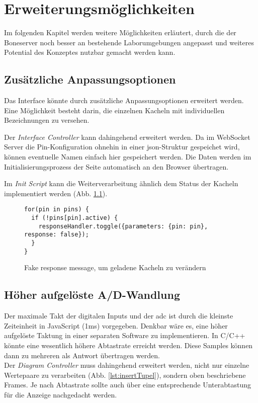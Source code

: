 \chapter{Erweiterungsmöglichkeiten}
Im folgenden Kapitel werden weitere Möglichkeiten erläutert, durch die der Boneserver noch besser an bestehende Laborumgebungen angepasst und weiteres Potential des Konzeptes nutzbar gemacht werden kann.

\section{Zusätzliche Anpassungsoptionen}
Das Interface könnte durch zusätzliche Anpassungsoptionen erweitert werden. Eine Mög\-lich\-keit besteht darin, die einzelnen Kacheln mit individuellen Bezeichnungen zu versehen.

Der \textit{Interface Controller} kann dahingehend erweitert werden. Da im WebSocket Server die Pin-Konfiguration ohnehin in einer \gls{json}-Struktur gespeichet wird, können eventuelle Namen einfach hier gespeichert werden. Die Daten werden im Initialisierungsprozess der Seite automatisch an den Browser übertragen.

Im \textit{Init Script} kann die Weiterverarbeitung ähnlich dem Status der Kacheln implementiert werden (Abb. \ref{lst:fakeResponseMessage}).

\begin{figure}[H]
\begin{lstlisting}
for(pin in pins) {
  if (!pins[pin].active) {
    responseHandler.toggle({parameters: {pin: pin}, response: false});
  }
}
\end{lstlisting}
\caption{Fake response message, um geladene Kacheln zu verändern}
\label{lst:fakeResponseMessage}
\end{figure}


\section{Höher aufgelöste A/D-Wandlung}
Der maximale Takt der digitalen Inputs und der \gls{adc} ist durch die kleinste Zeiteinheit in JavaScript (1ms) vorgegeben. Denkbar wäre es, eine höher aufgelöste Taktung in einer separaten Software zu implementieren. In C/C++ könnte eine wesentlich höhere Ab\-tast\-rate erreicht werden. Diese Samples können dann zu mehreren als Antwort übertragen werden.\\

Der \textit{Diagram Controller} muss dahingehend erweitert werden, nicht nur einzelne Wertepaare zu verarbeiten (Abb. \ref{lst:insertTupel}), sondern oben beschriebene Frames. Je nach Abtastrate sollte auch über eine entsprechende Unterabtastung für die Anzeige nachgedacht werden.


